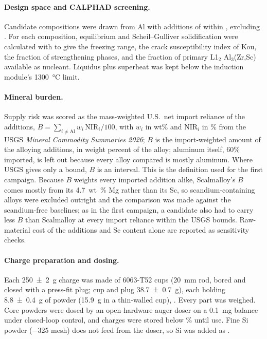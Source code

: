 \documentclass[11pt]{article}
\begin{document}
\paragraph{Design space and CALPHAD screening.}
Candidate compositions were drawn from Al with additions of  within
, excluding . For each
composition, equilibrium and Scheil--Gulliver solidification were calculated with
\cite{thermocalc2002,otis2017} to give the freezing range, the crack
susceptibility index of Kou,\cite{kou2015} the fraction of strengthening
phases, and the fraction of primary L1$_2$ Al$_3$(Zr,Sc) available as
nucleant. Liquidus plus superheat was kept below the induction module's
\SI{1300}{\celsius} limit. 

\paragraph{Mineral burden.}
Supply risk was scored as the mass-weighted U.S.\ net import reliance of the
additions, $B=\sum_{i\neq\text{Al}} w_i\,\mathrm{NIR}_i/100$, with $w_i$ in wt\%
and NIR$_i$ in \% from the USGS \textit{Mineral Commodity
Summaries 2026};\cite{usgs2026} $B$ is the import-weighted amount of the alloying
additions, in weight percent of the alloy; aluminum itself, 60\% imported, is
left out because every alloy compared is mostly aluminum. Where USGS gives only a
bound, $B$ is an interval.
This is the definition used for the first campaign. Because $B$ weights every imported addition alike,
Scalmalloy's $B$ comes mostly from its \SI{4.7}{wt\percent} Mg rather than its Sc,
so scandium-containing alloys were excluded outright and the comparison was made
against the scandium-free baselines; as in the first campaign, a candidate also had
to carry less $B$ than Scalmalloy at every import reliance within the USGS bounds.
Raw-material cost of the additions and Sc content alone are reported as sensitivity
checks.\cite{nassar2020,graedel2012}

\paragraph{Charge preparation and dosing.}
Each \SI{250 \pm 2}{\gram} charge was made of 6063-T52 cups
(\diameter\SI{20}{\milli\metre} rod, bored and closed with a press-fit plug;
cup and plug \SI{38.7 \pm 0.7}{\gram}), each holding \SI{8.8 \pm 0.4}{\gram} of
powder (\SI{15.9}{\gram} in a thin-walled cup), . Every part was weighed. Core powders were dosed by an
open-hardware auger doser on a \SI{0.1}{\milli\gram} balance under closed-loop
control, and charges were stored below \% until
use. Fine Si powder ($-$325 mesh) does not feed from the doser, so Si was added
as .
\end{document}
